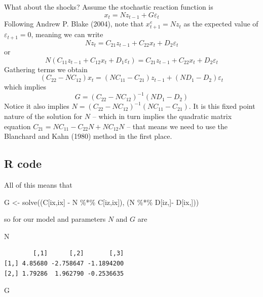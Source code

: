 \documentclass[
  letterpaper,
]{book}
\newenvironment{Shaded}{\begin{snugshade}}{\end{snugshade}}
\newcommand{\FunctionTok}[1]{\textcolor[rgb]{0.28,0.35,0.67}{#1}}
\newcommand{\NormalTok}[1]{\textcolor[rgb]{0.00,0.23,0.31}{#1}}
\newcommand{\OtherTok}[1]{\textcolor[rgb]{0.00,0.23,0.31}{#1}}
\newcommand{\SpecialCharTok}[1]{\textcolor[rgb]{0.37,0.37,0.37}{#1}}
\begin{document}
What about the shocks? Assume the stochastic reaction function is \[
  x_t = N z_{t-1} + G \varepsilon_t 
\] Following Andrew P. Blake (2004), note that \(x_{t+1}^e = N z_t\) as
the expected value of \(\varepsilon_{t+1}=0\), meaning we can write \[
 Nz_t = C_{21}z_{t-1} + C_{22} x_t + D_2 \varepsilon_t
\] or \[
 N\left( C_{11}z_{t-1} + C_{12}x_t + D_1 \varepsilon_t\right) = C_{21}z_{t-1} + C_{22} x_t + D_2 \varepsilon_t
\] Gathering terms we obtain \[
  (C_{22} - N C_{12}) x_t = (NC_{11} - C_{21}) z_{t-1} + (N D_1 - D_2) \varepsilon_t
\] which implies \[
G=(C_{22} - N C_{12})^{-1}(N D_1 - D_2) 
\] Notice it also implies
\(N = (C_{22} - N C_{12})^{-1}(NC_{11} - C_{21})\). It is this fixed
point nature of the solution for \(N\) -- which in turn implies the
quadratic matrix equation \(C_{21} = NC_{11} - C_{22}N + N C_{12}N\) --
that means we need to use the Blanchard and Kahn (1980) method in the
first place.

\hypertarget{r-code-1}{%
\subsection{R code}\label{r-code-1}}

All of this means that

\begin{Shaded}
\begin{Highlighting}[]
\NormalTok{G }\OtherTok{\textless{}{-}} \FunctionTok{solve}\NormalTok{((C[ix,ix] }\SpecialCharTok{{-}}\NormalTok{ N }\SpecialCharTok{\%*\%}\NormalTok{ C[iz,ix]), (N }\SpecialCharTok{\%*\%}\NormalTok{ D[iz,]}\SpecialCharTok{{-}}\NormalTok{ D[ix,]))}
\end{Highlighting}
\end{Shaded}

so for our model and parameters \(N\) and \(G\) are

\begin{Shaded}
\begin{Highlighting}[]
\NormalTok{N}
\end{Highlighting}
\end{Shaded}

\begin{verbatim}
        [,1]      [,2]       [,3]
[1,] 4.85680 -2.758647 -1.1894200
[2,] 1.79286  1.962790 -0.2536635
\end{verbatim}

\begin{Shaded}
\begin{Highlighting}[]
\NormalTok{G}
\end{Highlighting}
\end{Shaded}
\end{document}
